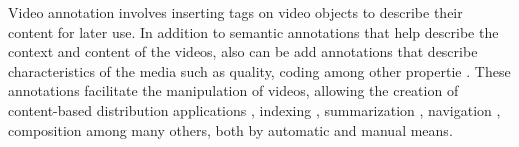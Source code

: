 
Video annotation involves inserting tags on video objects to describe their content for later use. In addition to semantic annotations that help describe the context and content of the videos, also can be add annotations that describe characteristics of the media such as quality, coding among other propertie \cite{Naphade:2004:DSC:1027527.1027680,Wang:2009:BDM:1652990.1653002,4420087}. These annotations facilitate the manipulation of videos, allowing the creation of content-based distribution applications \cite{Zhang:2012:KIE:2339530.2339620}, indexing \cite{Zhang:2007:PRS:1290082.1290126,Fendri:2010:SIS:1743384.1743446}, summarization \cite{Ishino:2012:SVH:2457524.2457633,Fiao:2016:AGS:3001773.3001802}, navigation \cite{Goldman:2008}, composition \cite{Wilk:2014:MVB:2647868.2654857,Wilk:2015:VCC:2713168.2713178} among many others, both by automatic and manual means\cite{Wang:2011:ALM:1899412.1899414}.






